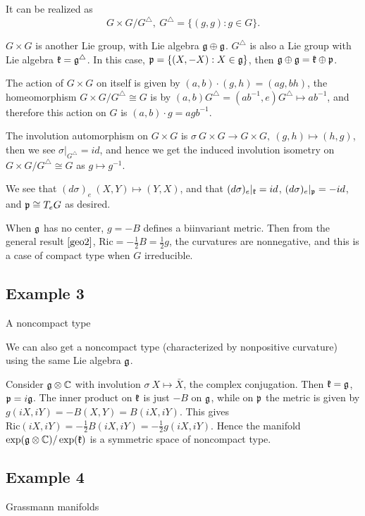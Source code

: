 	It can be realized as $$G\times G/G^{\triangle},\ G^{\triangle}=\{(g,g):g\in G\}.$$
	
	$G\times G$ is another Lie group, with Lie algebra ${\mathfrak g}\oplus{\mathfrak g}$. $G^{\triangle} $ is also a Lie group with Lie algebra ${\mathfrak k}={\mathfrak g}^{\triangle}$. In this case, ${\mathfrak p}=\{(X,-X):X\in {\mathfrak g}\}$, then ${\mathfrak g}\oplus{\mathfrak g}={\mathfrak k}\oplus{\mathfrak p}$. 
	
	The action of $G\times G$ on itself is given by $(a,b)\cdot (g,h)=(ag,bh)$, the homeomorphism $G\times G/G^{\triangle}\cong G$ is by $(a,b)G^{\triangle}=(ab^{-1},e)G^{\triangle}\mapsto ab^{-1}$, and therefore this action on $G$ is $(a,b)\cdot g=agb^{-1}$.

	The involution automorphism on $G\times G$ is $\sigma\:G\times G\to G\times G,\ (g,h)\mapsto (h,g)$, then we see $\sigma|_{G^{\triangle}}=id$, and hence we get the induced involution isometry on $G\times G/G^{\triangle}\cong G$ as $g\mapsto g^{-1}$.
	
	We see that $(d\sigma)_e\:
	(X,Y)\mapsto (Y,X)$, and that $(d\sigma)_e|_{{\mathfrak k}}=id$, $(d\sigma)_e|_{{\mathfrak p}}=-id$, and ${\mathfrak p}\cong T_eG$ as desired.

	When ${\mathfrak g}$ has no center, $g=-B$ defines a biinvariant
	metric. Then from the general result $\ref{geo2}$,
	$\mathrm{Ric}=-\frac{1}{2}B=\frac{1}{2}g$, the curvatures are
	nonnegative, and this is a case of compact type when $G$
	irreducible.

\subsection{Example 3}
\begin{center}
	A noncompact type
\end{center}
	
	We can also get a noncompact type (characterized by nonpositive curvature) using the same Lie algebra  ${\mathfrak g}$. 
	
	Consider ${\mathfrak g}\otimes\mathbb C$ with involution $\sigma\:
	X\mapsto \bar X$, the complex conjugation. Then ${\mathfrak k}={\mathfrak g}$,
	${\mathfrak p}=i{\mathfrak g}$. The inner product on ${\mathfrak k}$ is just $-B$ on
	${\mathfrak g}$, while on ${\mathfrak p}$ the metric is given by
	$g(iX,iY)=-B(X,Y)=B(iX,iY)$. This gives
	$\mathrm{Ric}(iX,iY)=-\frac{1}{2}B(iX,iY)=-\frac{1}{2}g(iX,i
	Y)$. Hence the manifold $\exp({\mathfrak g}\otimes\mathbb
	C)/\exp({\mathfrak k})$ is a symmetric space of noncompact type.

\subsection{Example 4}
\begin{center}
	Grassmann manifolds
\end{center}			
	
